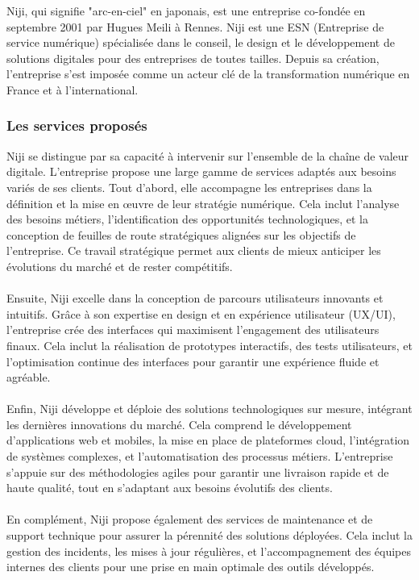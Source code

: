 \documentclass[12pt]{article}
\begin{document}
Niji, qui signifie "arc-en-ciel" en japonais, est une entreprise co-fondée en septembre 2001 par Hugues Meili à Rennes. Niji est une ESN (Entreprise de service numérique) spécialisée dans le conseil, le design et le développement de solutions digitales pour des entreprises de toutes tailles. Depuis sa création, l'entreprise s'est imposée comme un acteur clé de la transformation numérique en France et à l'international.

\subsubsection{Les services proposés}
Niji se distingue par sa capacité à intervenir sur l'ensemble de la chaîne de valeur digitale. L'entreprise propose une large gamme de services adaptés aux besoins variés de ses clients. 
Tout d'abord, elle accompagne les entreprises dans la définition et la mise en œuvre de leur stratégie numérique. Cela inclut l'analyse des besoins métiers, l'identification des opportunités technologiques, et la conception de feuilles de route stratégiques alignées sur les objectifs de l'entreprise. Ce travail stratégique permet aux clients de mieux anticiper les évolutions du marché et de rester compétitifs.
\\\\
Ensuite, Niji excelle dans la conception de parcours utilisateurs innovants et intuitifs. Grâce à son expertise en design et en expérience utilisateur (UX/UI), l'entreprise crée des interfaces qui maximisent l'engagement des utilisateurs finaux. Cela inclut la réalisation de prototypes interactifs, des tests utilisateurs, et l'optimisation continue des interfaces pour garantir une expérience fluide et agréable.
\\\\
Enfin, Niji développe et déploie des solutions technologiques sur mesure, intégrant les dernières innovations du marché. Cela comprend le développement d'applications web et mobiles, la mise en place de plateformes cloud, l'intégration de systèmes complexes, et l'automatisation des processus métiers. L'entreprise s'appuie sur des méthodologies agiles pour garantir une livraison rapide et de haute qualité, tout en s'adaptant aux besoins évolutifs des clients.
\\\\
En complément, Niji propose également des services de maintenance et de support technique pour assurer la pérennité des solutions déployées. Cela inclut la gestion des incidents, les mises à jour régulières, et l'accompagnement des équipes internes des clients pour une prise en main optimale des outils développés.
\end{document}

